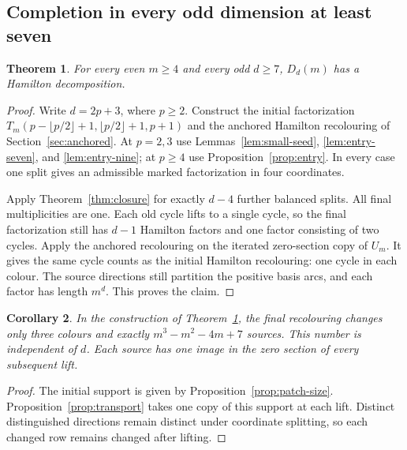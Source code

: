 \documentclass[11pt,reqno]{amsart}
\numberwithin{equation}{section}
\newtheorem{theorem}{Theorem}[section]
\newtheorem{corollary}[theorem]{Corollary}
\theoremstyle{definition}
\theoremstyle{remark}
\begin{document}
\subsection{Completion in every odd dimension at least seven}
\begin{theorem}\label{thm:oddconstruction}
For every even $m\ge4$ and every odd $d\ge7$, $D_d(m)$ has a Hamilton decomposition.
\end{theorem}
\begin{proof}
Write $d=2p+3$, where $p\ge2$. Construct the initial factorization
$T_m(p-\lfloor p/2\rfloor+1,\lfloor p/2\rfloor+1,p+1)$ and the anchored
Hamilton recolouring of Section~\ref{sec:anchored}. At $p=2,3$ use
Lemmas~\ref{lem:small-seed}, \ref{lem:entry-seven}, and \ref{lem:entry-nine};
at $p\ge4$ use Proposition~\ref{prop:entry}. In every case one split gives
an admissible marked factorization in four coordinates.

Apply Theorem~\ref{thm:closure} for exactly $d-4$ further balanced splits.
All final multiplicities are one. Each old cycle lifts to a single cycle,
so the final factorization still has $d-1$ Hamilton factors and one factor
consisting of two cycles. Apply the anchored recolouring on the iterated
zero-section copy of $U_m$. It gives the same cycle counts as the initial
Hamilton recolouring: one cycle in each colour.
The source directions still partition the positive basis arcs, and each factor
has length $m^d$. This proves the claim.
\end{proof}

\begin{corollary}\label{cor:support}
In the construction of Theorem~\ref{thm:oddconstruction}, the final recolouring changes only
three colours and exactly $m^3-m^2-4m+7$ sources. This number is independent of
$d$. Each source has one image in the zero section of every subsequent lift.
\end{corollary}
\begin{proof}
The initial support is given by Proposition~\ref{prop:patch-size}.
Proposition~\ref{prop:transport} takes one copy of this support at each lift.
Distinct distinguished directions remain distinct under coordinate
splitting, so each changed row remains changed after lifting.
\end{proof}
\end{document}
